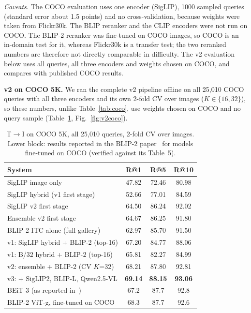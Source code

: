 \documentclass[conference]{IEEEtran}
\newcommand{\RA}{\ensuremath{\rightarrow}}
\newcommand{\best}[1]{\textbf{#1}}
\begin{document}
\emph{Caveats.} The COCO evaluation uses one encoder (SigLIP), 1000 sampled queries (standard error about
1.5 points) and no cross-validation, because weights were taken from Flickr30k. The BLIP reranker and the
CLIP encoders were not run on COCO. The BLIP-2 reranker was fine-tuned on COCO images, so COCO is an
in-domain test for it, whereas Flickr30k is a transfer test; the two reranked numbers are therefore not
directly comparable in difficulty. The v2 evaluation below uses all queries, all three encoders and weights
chosen on COCO, and compares with published COCO results.

\textbf{v2 on COCO 5K.} We ran the complete v2 pipeline offline on all 25{,}010 COCO queries with all three
encoders and its own 2-fold CV over images ($K\in\{16,32\}$), so these numbers, unlike Table~\ref{tab:coco}, use
weights chosen on COCO and no query sample (Table~\ref{tab:coco_v2}, Fig.~\ref{fig:v2coco}).

\begin{table}[t]
\centering
\caption{T\RA I on COCO 5K, all 25{,}010 queries, 2-fold CV over images. Lower block: results reported in the
BLIP-2 paper~\cite{li2023blip2} for models fine-tuned on COCO (verified against its Table~5).}
\label{tab:coco_v2}
\setlength{\tabcolsep}{4pt}
\begin{tabular}{l ccc}
\toprule
System & R@1 & R@5 & R@10 \\
\midrule
SigLIP image only                    & 47.82 & 72.46 & 80.98 \\
SigLIP hybrid (v1 first stage)       & 52.66 & 77.01 & 84.59 \\
SigLIP v2 first stage                & 64.50 & 86.24 & 92.02 \\
Ensemble v2 first stage              & 64.67 & 86.25 & 91.80 \\
BLIP-2 ITC alone (full gallery)      & 62.97 & 85.70 & 91.50 \\
\midrule
v1: SigLIP hybrid + BLIP-2 (top-16)  & 67.20 & 84.77 & 88.06 \\
v1: B/32 hybrid + BLIP-2 (top-16)    & 65.81 & 82.27 & 84.99 \\
v2: ensemble + BLIP-2 (CV $K$=32)    & 68.21 & 87.80 & 92.81 \\
v3: + SigLIP2, BLIP-L, Qwen2.5-VL    & \best{69.14} & \best{88.15} & \best{93.06} \\
\midrule
BEiT-3 (as reported in~\cite{li2023blip2})  & 67.2 & 87.7 & 92.8 \\
BLIP-2 ViT-g, fine-tuned on COCO     & 68.3 & 87.7 & 92.6 \\
\bottomrule
\end{tabular}
\end{table}
\end{document}
